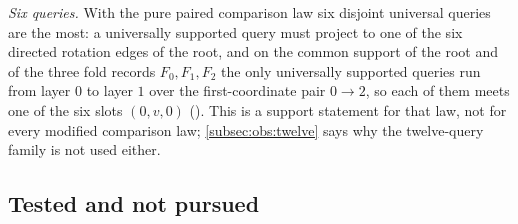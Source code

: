 \emph{Six queries.} With the pure paired comparison law six disjoint universal
queries are the most: a universally supported query must project to one of the
six directed rotation edges of the root, and on the common support of the root and of the three fold records $F_0,F_1,F_2$ the only universally supported queries run from
layer $0$ to layer $1$ over the first-coordinate pair $0\to2$, so each of them
meets one of the six slots $(0,v,0)$
(). This is
a support statement for that law, not for every modified comparison law;
\cref{subsec:obs:twelve} says why the twelve-query family is not used either.

\subsection{Tested and not pursued}\label{subsec:obs:tested}

